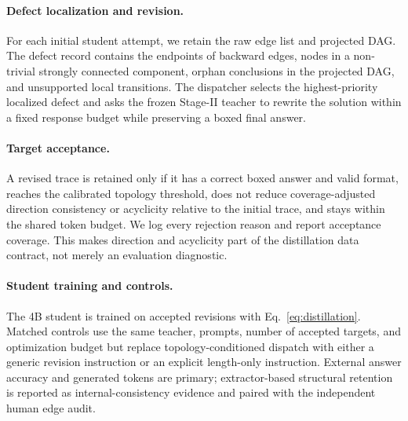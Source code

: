 \paragraph{Defect localization and revision.}
For each initial student attempt, we retain the raw edge list and projected DAG. The defect record contains the endpoints of backward edges, nodes in a non-trivial strongly connected component, orphan conclusions in the projected DAG, and unsupported local transitions. The dispatcher selects the highest-priority localized defect and asks the frozen Stage-II teacher to rewrite the solution within a fixed response budget while preserving a boxed final answer.

\paragraph{Target acceptance.}
A revised trace is retained only if it has a correct boxed answer and valid format, reaches the calibrated topology threshold, does not reduce coverage-adjusted direction consistency or acyclicity relative to the initial trace, and stays within the shared token budget. We log every rejection reason and report acceptance coverage. This makes direction and acyclicity part of the distillation data contract, not merely an evaluation diagnostic.

\paragraph{Student training and controls.}
The 4B student is trained on accepted revisions with Eq.~\ref{eq:distillation}. Matched controls use the same teacher, prompts, number of accepted targets, and optimization budget but replace topology-conditioned dispatch with either a generic revision instruction or an explicit length-only instruction. External answer accuracy and generated tokens are primary; extractor-based structural retention is reported as internal-consistency evidence and paired with the independent human edge audit.

